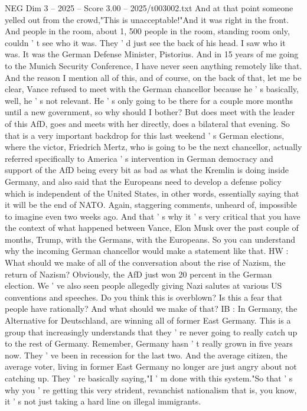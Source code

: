 \begin{textsample}{NEG Dim 3 – 2025 – Score 3.00 – 2025/t003002.txt}
And at that point someone yelled out from the crowd,"This is unacceptable!"And it was right in the front.
And people in the room, about 1, 500 people in the room, standing room only, couldn ' t see who it was.
They ' d just see the back of his head.
I saw who it was.
It was the German Defense Minister, Pistorius.
And in 15 years of me going to the Munich Security Conference, I have never seen anything remotely like that.
And the reason I mention all of this, and of course, on the back of that, let me be clear, Vance refused to meet with the German chancellor because he ' s basically, well, he ' s not relevant.
He ' s only going to be there for a couple more months until a new government, so why should I bother?
But does meet with the leader of this AfD, goes and meets with her directly, does a bilateral that evening.
So that is a very important backdrop for this last weekend ' s German elections, where the victor, Friedrich Mertz, who is going to be the next chancellor, actually referred specifically to America ' s intervention in German democracy and support of the AfD being every bit as bad as what the Kremlin is doing inside Germany, and also said that the Europeans need to develop a defense policy which is independent of the United States, in other words, essentially saying that it will be the end of NATO.
Again, staggering comments, unheard of, impossible to imagine even two weeks ago.
And that ' s why it ' s very critical that you have the context of what happened between Vance, Elon Musk over the past couple of months, Trump, with the Germans, with the Europeans.
So you can understand why the incoming German chancellor would make a statement like that.
HW : What should we make of all of the conversation about the rise of Nazism, the return of Nazism?
Obviously, the AfD just won 20 percent in the German election.
We ' ve also seen people allegedly giving Nazi salutes at various US conventions and speeches.
Do you think this is overblown?
Is this a fear that people have rationally?
And what should we make of that?
IB : In Germany, the Alternative for Deutschland, are winning all of former East Germany.
This is a group that increasingly understands that they ' re never going to really catch up to the rest of Germany.
Remember, Germany hasn ' t really grown in five years now.
They ' ve been in recession for the last two.
And the average citizen, the average voter, living in former East Germany no longer are just angry about not catching up.
They ' re basically saying,"I ' m done with this system."So that ' s why you ' re getting this very strident, revanchist nationalism that is, you know, it ' s not just taking a hard line on illegal immigrants.

\end{textsample}
